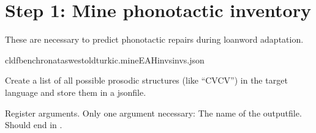 \documentclass[letterpaper,10pt,english]{sphinxmanual}
\begin{document}
\section{Step 1: Mine phonotactic inventory}
\label{\detokenize{mkloanpy:step-1-mine-phonotactic-inventory}}
\sphinxAtStartPar
These are necessary to predict phonotactic repairs during loanword adaptation.

\begin{sphinxVerbatim}[commandchars=\\\{\}]
cldfbenchronataswestoldturkic.mineEAHinvsinvs.json
\end{sphinxVerbatim}
\label{\detokenize{mkloanpy:module-ronataswestoldturkiccommands.mineEAHinvs}}
\sphinxAtStartPar
Create a list of all possible prosodic structures (like “CVCV”) in the
target language and store them in a json\sphinxhyphen{}file.

\begin{fulllineitems}
\label{\detokenize{mkloanpy:ronataswestoldturkiccommands.mineEAHinvs.register}}
\pysigstartsignatures
{}
\pysigstopsignatures
\sphinxAtStartPar
Register arguments. Only one argument necessary: The name of the
output\sphinxhyphen{}file. Should end in .

\end{fulllineitems}

\end{document}

